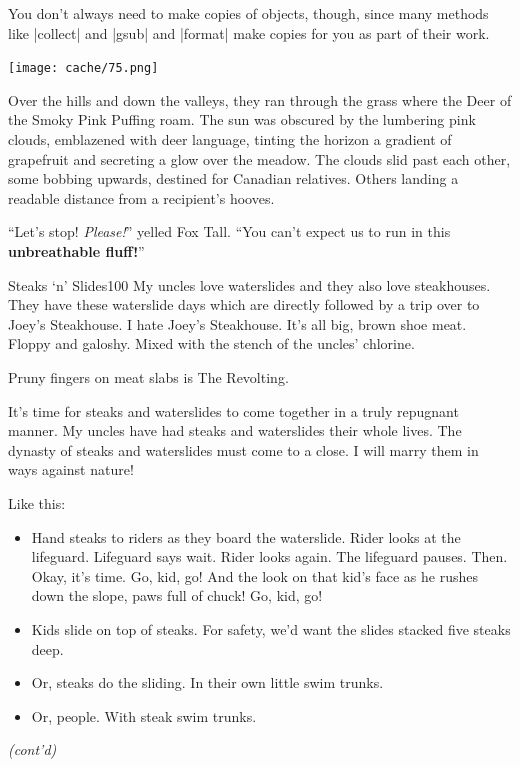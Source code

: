\documentclass[12pt,twoside]{report}
\begin{document}
You don't always need to make copies of objects, though, since many
methods like \rubyinline|collect| and
\rubyinline|gsub| and
\rubyinline|format| make copies for you as part of
their work.

	\texttt{[image: cache/75.png]}

Over the hills and down the valleys, they ran through the grass where
the Deer of the Smoky Pink Puffing roam.  The sun was obscured by the
lumbering pink clouds, emblazened with deer language, tinting the
horizon a gradient of grapefruit and secreting a glow over the meadow.
The clouds slid past each other, some bobbing upwards, destined for
Canadian relatives.  Others landing a readable distance from a
recipient's hooves.

``Let's stop!  {\em Please!}'' yelled Fox Tall.  ``You can't expect us
to run in this {\bf unbreathable fluff!}''

\pagebreak

	\begin{sidebar}{Steaks `n' Slides}{100}
		My uncles love waterslides and they also love steakhouses. They have these waterslide days which are directly followed by a trip over to Joey's Steakhouse. I hate Joey's Steakhouse. It's all big, brown shoe meat. Floppy and galoshy. Mixed with the stench of the uncles' chlorine.\vspace{6pt}
		
		Pruny fingers on meat slabs is The Revolting.\vspace{6pt}

		It's time for steaks and waterslides to come together in a truly repugnant manner. My uncles have had steaks and waterslides their whole lives. The dynasty of steaks and waterslides must come to a close. I will marry them in ways against nature!\vspace{6pt}
		
		Like this:
		\begin{itemize}
			\item Hand steaks to riders as they board the waterslide. Rider looks at the lifeguard. Lifeguard says wait. Rider looks again. The lifeguard pauses. Then. Okay, it's time. Go, kid, go! And the look on that kid's face as he rushes down the slope, paws full of chuck! Go, kid, go!
			\item Kids slide on top of steaks. For safety, we'd want the slides stacked five steaks deep.
			\item Or, steaks do the sliding. In their own little swim trunks.
			\item Or, people. With steak swim trunks.
		\end{itemize}
		\textit{(cont'd)}\vspace{6pt}
	\end{sidebar}
\end{document}
